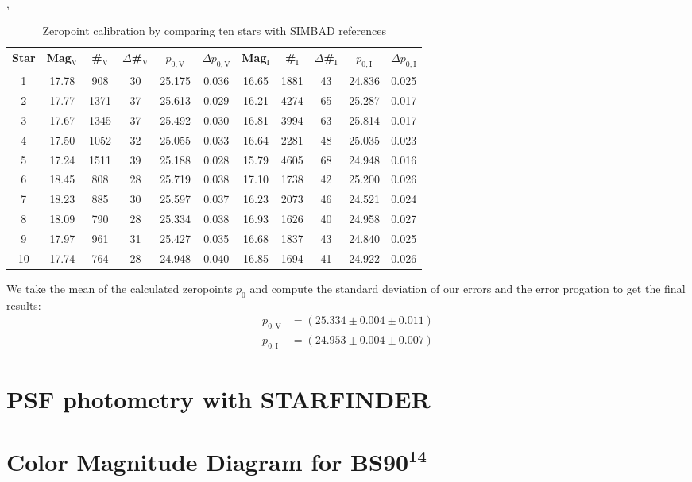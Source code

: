 	\begin{table}[H]
\setlength{\tabcolsep}{2mm}
\renewcommand{\arraystretch}{1.5}
\begin{adjustbox}{width=\textwidth, height= .26\textwidth}, 
\begin{tabular}{|c||c|c|c|c|c||c|c|c|c|c|}
\hline
Star & Mag$_{\text{V}}$ & \#$_{\text{V}}$ & $\Delta$\#$_{\text{V}}$ & $p_{0,\text{V}}$ &$\Delta p_{0,\text{V}}$ & Mag$_{\text{I}}$ & \#$_{\text{I}}$ & $\Delta$\#$_{\text{I}}$ & $p_{0,\text{I}}$ &$\Delta p_{0,\text{I}}$\\ \hline \hline
1 & 17.78 & 908 & 30 & 25.175 & 0.036 & 16.65 & 1881 & 43 & 24.836 & 0.025 \\
2 & 17.77 & 1371 & 37 & 25.613 & 0.029 & 16.21 & 4274 & 65 & 25.287 & 0.017 \\
3 & 17.67 & 1345 & 37 & 25.492 & 0.030 & 16.81 & 3994 & 63 & 25.814 & 0.017 \\
4 & 17.50 & 1052 & 32 & 25.055 & 0.033 & 16.64 & 2281 & 48 & 25.035 & 0.023 \\
5 & 17.24 & 1511 & 39 & 25.188& 0.028 & 15.79 & 4605 & 68 & 24.948 & 0.016 \\
6 & 18.45 & 808 & 28 & 25.719 & 0.038 & 17.10 & 1738 & 42 &  25.200 & 0.026 \\
7 & 18.23 & 885 & 30 & 25.597 & 0.037 & 16.23 & 2073 & 46 &  24.521 & 0.024 \\
8 & 18.09 & 790 & 28 & 25.334 & 0.038 & 16.93 & 1626 & 40 & 24.958 & 0.027 \\
9 & 17.97 & 961 & 31 & 25.427 & 0.035 & 16.68 & 1837 & 43 &  24.840 & 0.025 \\
10 & 17.74 & 764 & 28 & 24.948 & 0.040 & 16.85 &  1694 & 41 & 24.922 & 0.026 \\
\hline
\end{tabular}
\end{adjustbox}
\caption{\label{tab:2} Zeropoint calibration by comparing ten stars with SIMBAD references}
\end{table}

	
We take the mean of the calculated zeropoints $p_0$ and compute the standard deviation of our errors and the error progation to get the final results: 
\begin{align*}
	p_{0,\text{V}} &= (25.334 \pm 0.004 \pm 0.011) \\
	p_{0,\text{I}} &= (24.953 \pm 0.004 \pm 0.007)
\end{align*}

\section{PSF photometry with STARFINDER}
\blindtext


\section{Color Magnitude Diagram for BS90$^{\mathbf{14}}$ }
